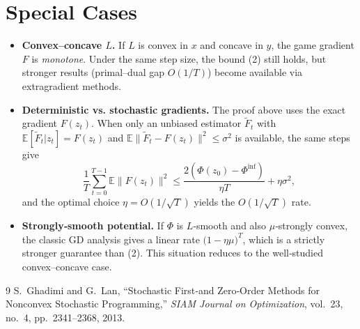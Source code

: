 \documentclass{article}
\newcommand{\E}{\mathbb{E}}
\begin{document}
\section*{Special Cases}
\begin{itemize}
\item \textbf{Convex–concave $L$.} If $L$ is convex in $x$ and concave in $y$, the game gradient $F$ is \emph{monotone}. Under the same step size, the bound (2) still holds, but stronger results (primal–dual gap $O(1/T)$) become available via extragradient methods.

\item \textbf{Deterministic vs. stochastic gradients.} The proof above uses the exact gradient $F(z_t)$. When only an unbiased estimator $\tilde F_t$ with $\E[\tilde F_t|z_t]=F(z_t)$ and $\E\|\tilde F_t-F(z_t)\|^{2}\le\sigma^{2}$ is available, the same steps give
\[
\frac{1}{T}\sum_{t=0}^{T-1}\E\|F(z_t)\|^{2}
\le\frac{2(\Phi(z_0)-\Phi^{\inf})}{\eta T}
     +\eta\sigma^{2},
\]
and the optimal choice $\eta=O(1/\sqrt{T})$ yields the $O(1/\sqrt{T})$ rate.

\item \textbf{Strongly‑smooth potential.} If $\Phi$ is $L$‑smooth and also $\mu$‑strongly convex, the classic GD analysis gives a linear rate $\bigl(1-\eta\mu\bigr)^{T}$, which is a strictly stronger guarantee than (2). This situation reduces to the well‑studied convex–concave case.
\end{itemize}

\newpage
\begin{thebibliography}{9}
S.~Ghadimi and G.~Lan, ``Stochastic First‑and Zero‑Order Methods for Nonconvex Stochastic Programming,'' \emph{SIAM Journal on Optimization}, vol.~23, no.~4, pp.~2341–2368, 2013.
\end{thebibliography}
\end{document}
